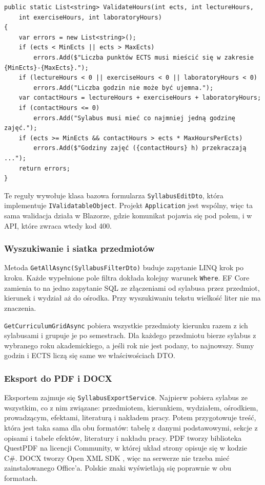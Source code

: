 \documentclass[times]{san}
\begin{document}
\begin{lstlisting}[language={[Sharp]C}, caption={Reguły walidacji godzin (fragment \texttt{SyllabusRules})}, label={lst:reguly}]
public static List<string> ValidateHours(int ects, int lectureHours,
    int exerciseHours, int laboratoryHours)
{
    var errors = new List<string>();
    if (ects < MinEcts || ects > MaxEcts)
        errors.Add($"Liczba punktów ECTS musi mieścić się w zakresie {MinEcts}-{MaxEcts}.");
    if (lectureHours < 0 || exerciseHours < 0 || laboratoryHours < 0)
        errors.Add("Liczba godzin nie może być ujemna.");
    var contactHours = lectureHours + exerciseHours + laboratoryHours;
    if (contactHours <= 0)
        errors.Add("Sylabus musi mieć co najmniej jedną godzinę zajęć.");
    if (ects >= MinEcts && contactHours > ects * MaxHoursPerEcts)
        errors.Add($"Godziny zajęć ({contactHours} h) przekraczają ...");
    return errors;
}
\end{lstlisting}

Te reguły wywołuje klasa bazowa formularza \texttt{SyllabusEditDto}, która implementuje \texttt{IValidatableObject}. Projekt \texttt{Application} jest wspólny, więc ta sama walidacja działa w Blazorze, gdzie komunikat pojawia się pod polem, i w API, które zwraca wtedy kod 400.

\subsubsection{Wyszukiwanie i siatka przedmiotów}

Metoda \texttt{GetAllAsync(SyllabusFilterDto)} buduje zapytanie LINQ krok po kroku. Każde wypełnione pole filtra dokłada kolejny warunek \texttt{Where}. EF Core zamienia to na jedno zapytanie SQL ze złączeniami od sylabusa przez przedmiot, kierunek i wydział aż do ośrodka. Przy wyszukiwaniu tekstu wielkość liter nie ma znaczenia.

\texttt{GetCurriculumGridAsync} pobiera wszystkie przedmioty kierunku razem z ich sylabusami i grupuje je po semestrach. Dla każdego przedmiotu bierze sylabus z wybranego roku akademickiego, a jeśli rok nie jest podany, to najnowszy. Sumy godzin i ECTS liczą się same we właściwościach DTO.

\subsubsection{Eksport do PDF i DOCX}

Eksportem zajmuje się \texttt{SyllabusExportService}. Najpierw pobiera sylabus ze wszystkim, co z nim związane: przedmiotem, kierunkiem, wydziałem, ośrodkiem, prowadzącym, efektami, literaturą i nakładem pracy. Potem przygotowuje treść, która jest taka sama dla obu formatów: tabelę z danymi podstawowymi, sekcje z opisami i tabele efektów, literatury i nakładu pracy. PDF tworzy biblioteka QuestPDF \cite{questpdf} na licencji Community, w której układ strony opisuje się w kodzie C\#. DOCX tworzy Open XML SDK \cite{openxml}, więc na serwerze nie trzeba mieć zainstalowanego Office'a. Polskie znaki wyświetlają się poprawnie w obu formatach.
\end{document}
